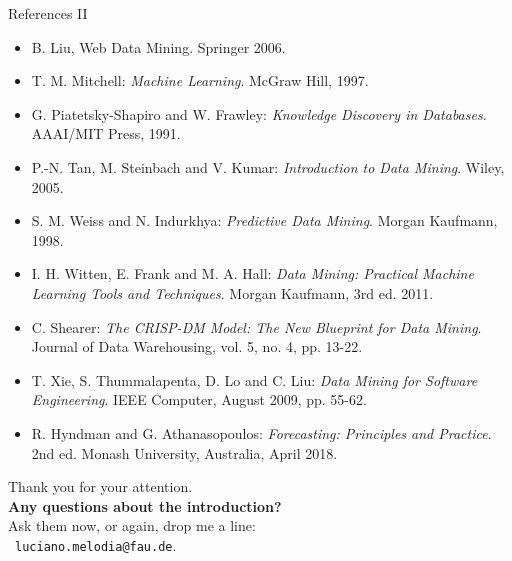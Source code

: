 \documentclass[aspectratio=169,t]{beamer}
\begin{document}
  { 
    \begin{frame}{References II}
        \begin{itemize}
          \item B. Liu, Web Data Mining. Springer 2006.
          \item T. M. Mitchell: \emph{Machine Learning}. McGraw Hill, 1997.
          \item G. Piatetsky-Shapiro and W. Frawley: \emph{Knowledge Discovery in Databases}. AAAI/MIT Press, 1991.
          \item P.-N. Tan, M. Steinbach and V. Kumar: \emph{Introduction to Data Mining}. Wiley, 2005.
          \item S. M. Weiss and N. Indurkhya: \emph{Predictive Data Mining}. Morgan Kaufmann, 1998.
          \item I. H. Witten, E. Frank and M. A. Hall: \emph{Data Mining: Practical Machine Learning Tools and Techniques}. Morgan Kaufmann, 3rd ed. 2011.
          \item C. Shearer: \emph{The CRISP-DM Model: The New Blueprint for Data Mining}. Journal of Data Warehousing, vol. 5, no. 4, pp. 13-22.
          \item T. Xie, S. Thummalapenta, D. Lo and C. Liu: \emph{Data Mining for Software Engineering}. IEEE Computer, August 2009, pp. 55-62.
          \item R. Hyndman and G. Athanasopoulos: \emph{Forecasting: Principles and Practice}. 2nd ed. Monash University, Australia, April 2018.
        \end{itemize}
    \end{frame}
  }


  { %
    \begin{frame}[c]
      \begin{center}
        Thank you for your attention.\\
        {\bf Any questions about the introduction?}\\[0.5cm]
        Ask them now, or again, drop me a line: \\ 
        \faSendO \ \texttt{luciano.melodia@fau.de}.
      \end{center}
    \end{frame}
  }
\end{document}

